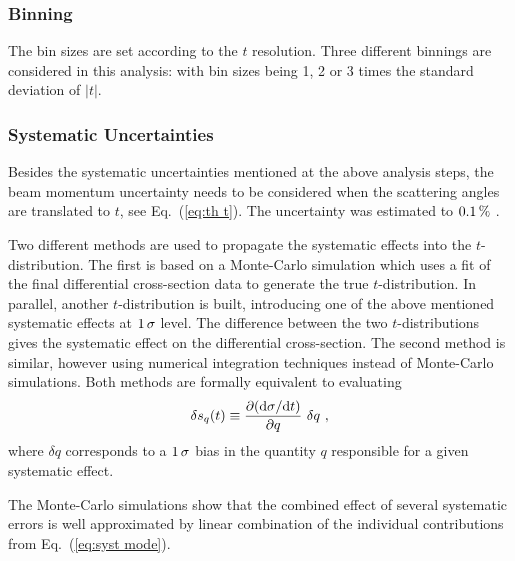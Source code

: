 



\subsubsection{Binning}
\label{sec:binning}

The bin sizes are set according to the $t$ resolution. Three different binnings are considered in this analysis: with bin sizes being 1, 2 or 3 times the standard deviation of $|t|$.




\subsubsection{Systematic Uncertainties}
\label{sec:systematics}

Besides the systematic uncertainties mentioned at the above analysis steps, the beam momentum uncertainty needs to be considered when the scattering angles are translated to $t$, see Eq.~(\ref{eq:th t}). The uncertainty was estimated to $0.1\,{\rm \%}$ .

Two different methods are used to propagate the systematic effects into the $t$-distribution. The first is based on a Monte-Carlo simulation which uses a fit of the final differential cross-section data to generate the true $t$-distribution. In parallel, another $t$-distribution is built, introducing one of the above mentioned systematic effects at $1\,{\rm \sigma}$ level. The difference between the two $t$-distributions gives the systematic effect on the differential cross-section. The second method is similar, however using numerical integration techniques instead of Monte-Carlo simulations. Both methods are formally equivalent to evaluating
\begin{equation}
\label{eq:syst mode}
\delta s_{q}(t) \equiv \frac{\partial({\rm d}\sigma/{\rm d} t)}{\partial q}\ \delta q\ ,
\end{equation}
where $\delta q$ corresponds to a $1\,{\rm \sigma}$ bias in the quantity $q$ responsible for a given systematic effect.

The Monte-Carlo simulations show that the combined effect of several systematic errors is well approximated by linear combination of the individual contributions from Eq.~(\ref{eq:syst mode}).



